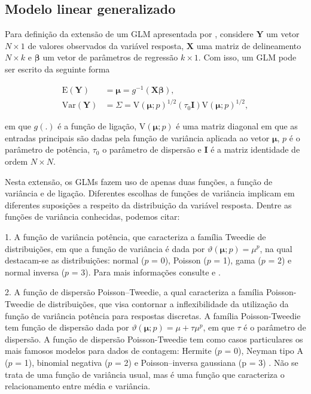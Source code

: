 \subsection{Modelo linear generalizado}

Para definição da extensão de um GLM apresentada por \citet{Bonat16}, considere $\boldsymbol{Y}$ um vetor $N \times 1$ de valores observados da variável resposta, $\boldsymbol{X}$ uma matriz de delineamento $N \times k$ e $\boldsymbol{\beta}$ um vetor de parâmetros de regressão $k \times 1$. Com isso, um GLM pode ser escrito da seguinte forma 

\begin{equation}
\label{eq:glm}
      \begin{aligned}
        \mathrm{E}(\boldsymbol{Y}) &=
         \boldsymbol{\mu} =
            g^{-1}(\boldsymbol{X} \boldsymbol{\beta}),
            \\
        \mathrm{Var}(\boldsymbol{Y}) &=
          \Sigma =
          \mathrm{V}\left(\boldsymbol{\mu}; p\right)^{1/2}\left(\tau_0\boldsymbol{I}\right)\mathrm{V}\left(\boldsymbol{\mu}; p\right)^{1/2},
      \end{aligned}
\end{equation}

\noindent em que $g(.)$ é a função de ligação, $\mathrm{V}\left(\boldsymbol{\mu}; p\right)$ é uma matriz diagonal em que as entradas principais são dadas pela função de variância aplicada ao vetor $\boldsymbol{\mu}$, $p$ é o parâmetro de potência, $\tau_0$ o parâmetro de dispersão e $\boldsymbol{I}$ é a matriz identidade de ordem $N\times N$.

Nesta extensão, os GLMs fazem uso de apenas duas funções, a função de variância e de ligação. Diferentes escolhas de funções de variância implicam em diferentes suposições a respeito da distribuição da variável resposta. Dentre as funções de variância conhecidas, podemos citar:

1. A função de variância potência, que caracteriza a família Tweedie de distribuições, em que a função de variância é dada por $\vartheta\left(\boldsymbol{\mu}; p\right) = \mu^p$, na qual destacam-se as distribuições: normal ($p$ = 0), Poisson ($p$ = 1), gama ($p$ = 2) e  normal inversa ($p$ = 3). Para mais informações consulte \citet{Jorgensen87} e \citet{Jorgensen97}.

2. A função de dispersão Poisson–Tweedie, a qual caracteriza a família Poisson-Tweedie de distribuições, que visa contornar a inflexibilidade da utilização da função de variância potência para  respostas discretas. A família Poisson-Tweedie tem função de dispersão dada por $\vartheta\left(\boldsymbol{\mu}; p\right) = \mu + \tau\mu^p$, em que $\tau$ é o parâmetro de dispersão. A função de dispersão Poisson-Tweedie tem como casos particulares os mais famosos modelos para dados de contagem: Hermite ($p$ = 0), Neyman tipo A ($p$ = 1), binomial negativa ($p$ = 2) e Poisson–inversa gaussiana (p = $3$) \citep{Jorgensen15}. Não se trata de uma função de variância usual, mas é uma função que caracteriza o relacionamento entre média e variância.

